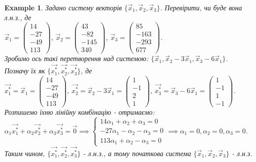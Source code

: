 \documentclass[a4paper, 10pt]{article}
\theoremstyle{theoremdd}
\newtheorem{example}[theorem]{Example}
\begin{document}
	\begin{example}
	Задано систему векторів $\{\vec{x}_1,\vec{x}_2,\vec{x}_3\}$. Перевірити, чи буде вона л.н.з., де \\ $\vec{x}_1 = \begin{pmatrix}
	14 \\ -27 \\ -49 \\ 113
	\end{pmatrix}$, $\vec{x}_2 = \begin{pmatrix}
	43 \\ -82 \\ -145 \\ 340
	\end{pmatrix}$, $\vec{x}_3 = \begin{pmatrix}
	85 \\ -163 \\ -293 \\ 677
	\end{pmatrix}$.\\
	Зробимо ось такі перетворення над системою: $\{\vec{x}_1, \vec{x}_2 - 3 \vec{x}_1, \vec{x}_3 - 6\vec{x}_1 \}$. Позначу їх як $\{\vec{x^*_1},\vec{x^*_2},\vec{x^*_3}\}$, де\\
	$\vec{x^*_1} = \vec{x}_1 = \begin{pmatrix}
	14 \\ -27 \\ -49 \\ 113
	\end{pmatrix}$, $\vec{x^*_2} = \vec{x}_2 - 3\vec{x}_1 = \begin{pmatrix}
	1 \\ -1 \\ 2 \\ 1
	\end{pmatrix}$, $\vec{x^*_3} = \vec{x}_3 - 6\vec{x}_1 = \begin{pmatrix}
	1 \\ -1 \\ 1 \\ -1
	\end{pmatrix}$.\\
	Розпишемо їхню лінійну комбінацію - отримаємо:\\
	$\alpha_1 \vec{x^*_1} + \alpha_2 \vec{x^*_2} + \alpha_3 \vec{x^*_3} = \vec{0} \implies \begin{cases} 14 \alpha_1 + \alpha_2 + \alpha_3 = 0 \\
					   -27 \alpha_1 - \alpha_2 - \alpha_3 = 0 \\
					   113 \alpha_1 + \alpha_2 - \alpha_3 = 0
	\end{cases} \implies \alpha_1 = 0, \alpha_2 = 0, \alpha_3 = 0$.\\
	Таким чином, $\{\vec{x^*_1}, \vec{x^*_2}, \vec{x^*_3}\}$ - л.н.з., а тому початкова система $\{\vec{x}_1,\vec{x}_2,\vec{x}_3\}$ - л.н.з.
	\end{example}
	
\end{document}
